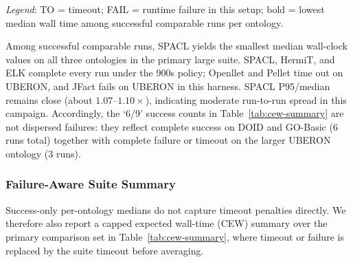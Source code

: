 \documentclass[preprint,12pt,times]{elsarticle}
\begin{document}
\begin{table}[htbp]
\centering
\caption{Large Head-to-Head Consistency Benchmark (median wall time across 3 clean runs, ms; timeout 900s; SPACL P95 shown for spread)}
\label{tab:competitor-benchmarks}
\end{table}
\noindent\footnotesize\textit{Legend}: TO = timeout; FAIL = runtime failure in this setup; bold = lowest median wall time among successful comparable runs per ontology.
\normalsize

Among successful comparable runs, SPACL yields the smallest median wall-clock values on all three ontologies in the primary large suite. SPACL, HermiT, and ELK complete every run under the 900s policy; Openllet and Pellet time out on UBERON, and JFact fails on UBERON in this harness. SPACL P95/median remains close (about $1.07$--$1.10\times$), indicating moderate run-to-run spread in this campaign. Accordingly, the `6/9' success counts in Table~\ref{tab:cew-summary} are not dispersed failures: they reflect complete success on DOID and GO-Basic (6 runs total) together with complete failure or timeout on the larger UBERON ontology (3 runs).

\subsubsection{Failure-Aware Suite Summary}
\label{sec:cew}

Success-only per-ontology medians do not capture timeout penalties directly. We therefore also report a capped expected wall-time (CEW) summary over the primary comparison set in Table~\ref{tab:cew-summary}, where timeout or failure is replaced by the suite timeout before averaging.
\end{document}
